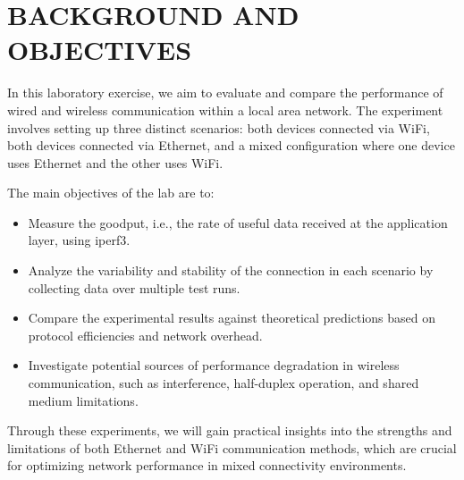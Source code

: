 
\section{BACKGROUND AND OBJECTIVES} \label{sec:background-and-objectives}

In this laboratory exercise, we aim to evaluate and compare the performance of wired and wireless communication within a local area network. The experiment involves setting up three distinct scenarios: both devices connected via WiFi, both devices connected via Ethernet, and a mixed configuration where one device uses Ethernet and the other uses WiFi. 

The main objectives of the lab are to:
\begin{itemize}
    \item Measure the goodput, i.e., the rate of useful data received at the application layer, using iperf3.
    \item Analyze the variability and stability of the connection in each scenario by collecting data over multiple test runs.
    \item Compare the experimental results against theoretical predictions based on protocol efficiencies and network overhead.
    \item Investigate potential sources of performance degradation in wireless communication, such as interference, half-duplex operation, and shared medium limitations.
\end{itemize}

Through these experiments, we will gain practical insights into the strengths and limitations of both Ethernet and WiFi communication methods, which are crucial for optimizing network performance in mixed connectivity environments.






    